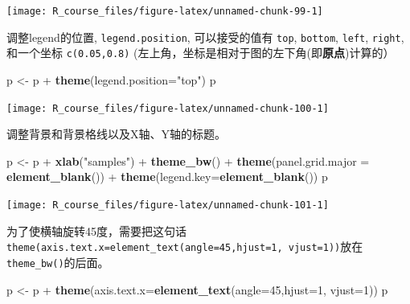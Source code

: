 \documentclass[]{article}
\newenvironment{Shaded}{\begin{snugshade}}{\end{snugshade}}
\newcommand{\KeywordTok}[1]{\textcolor[rgb]{0.13,0.29,0.53}{\textbf{{#1}}}}
\newcommand{\DataTypeTok}[1]{\textcolor[rgb]{0.13,0.29,0.53}{{#1}}}
\newcommand{\DecValTok}[1]{\textcolor[rgb]{0.00,0.00,0.81}{{#1}}}
\newcommand{\StringTok}[1]{\textcolor[rgb]{0.31,0.60,0.02}{{#1}}}
\newcommand{\NormalTok}[1]{{#1}}
\numberwithin{figure}{section}
\numberwithin{table}{section}
\theoremstyle{definition}
\theoremstyle{definition}
\theoremstyle{definition}
\theoremstyle{remark}
\begin{document}
\begin{center}\texttt{[image: R\_course\_files/figure-latex/unnamed-chunk-99-1]} \end{center}

调整legend的位置, \texttt{legend.position}, 可以接受的值有 \texttt{top},
\texttt{bottom}, \texttt{left}, \texttt{right}, 和一个坐标
\texttt{c(0.05,0.8)}
(左上角，坐标是相对于图的左下角(即\textbf{原点})计算的）

\begin{Shaded}
\begin{Highlighting}[]
\NormalTok{p <-}\StringTok{ }\NormalTok{p +}\StringTok{ }\KeywordTok{theme}\NormalTok{(}\DataTypeTok{legend.position=}\StringTok{"top"}\NormalTok{)}
\NormalTok{p}
\end{Highlighting}
\end{Shaded}

\begin{center}\texttt{[image: R\_course\_files/figure-latex/unnamed-chunk-100-1]} \end{center}

调整背景和背景格线以及X轴、Y轴的标题。

\begin{Shaded}
\begin{Highlighting}[]
\NormalTok{p <-}\StringTok{ }\NormalTok{p +}\StringTok{ }\KeywordTok{xlab}\NormalTok{(}\StringTok{"samples"}\NormalTok{) +}\StringTok{ }\KeywordTok{theme_bw}\NormalTok{() +}\StringTok{ }\KeywordTok{theme}\NormalTok{(}\DataTypeTok{panel.grid.major =} \KeywordTok{element_blank}\NormalTok{()) +}\StringTok{ }
\StringTok{    }\KeywordTok{theme}\NormalTok{(}\DataTypeTok{legend.key=}\KeywordTok{element_blank}\NormalTok{())}
\NormalTok{p}
\end{Highlighting}
\end{Shaded}

\begin{center}\texttt{[image: R\_course\_files/figure-latex/unnamed-chunk-101-1]} \end{center}

为了使横轴旋转45度，需要把这句话\texttt{theme(axis.text.x=element\_text(angle=45,hjust=1,\ vjust=1))}放在\texttt{theme\_bw()}的后面。

\begin{Shaded}
\begin{Highlighting}[]
\NormalTok{p <-}\StringTok{ }\NormalTok{p +}\StringTok{ }\KeywordTok{theme}\NormalTok{(}\DataTypeTok{axis.text.x=}\KeywordTok{element_text}\NormalTok{(}\DataTypeTok{angle=}\DecValTok{45}\NormalTok{,}\DataTypeTok{hjust=}\DecValTok{1}\NormalTok{, }\DataTypeTok{vjust=}\DecValTok{1}\NormalTok{))}
\NormalTok{p}
\end{Highlighting}
\end{Shaded}
\end{document}
